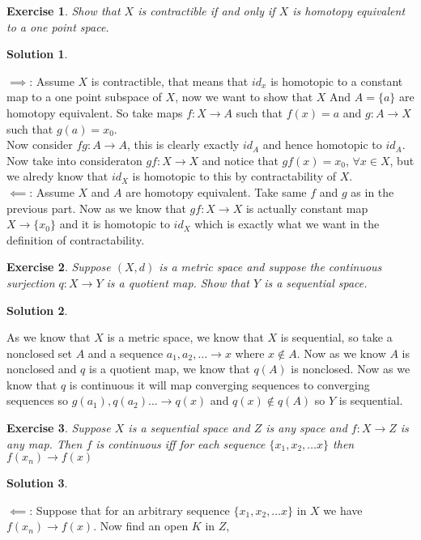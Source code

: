 \documentclass[11pt,a4paper]{article}
\newtheorem{Ex}{Exercise}
\newtheorem{Sol}{Solution}
\newcommand{\ra}{\rightarrow}
\begin{document}
\begin{Ex}
	Show that $X$ is contractible if and only if $X$ is homotopy equivalent to a one point space.
\end{Ex} 

\begin{Sol}\end{Sol}
\noindent $\implies$: Assume $X$ is contractible, that means that $id_x$ is homotopic to a constant map to a one point subspace of $X$, now we want to show that $X$ And $A = \{a\}$ are homotopy equivalent. So take maps $f: X \ra A$ such that $f(x) =a$ and $g: A \ra X$ such that $g(a) = x_0$. \\
Now consider $fg : A \ra A$, this is clearly exactly $id_A$ and hence homotopic to $id_A$. Now take into consideraton $gf: X \ra X$ and notice that $gf(x) = x_0$, $\forall x\in X$, but we alredy know that $id_X$ is homotopic to this by contractability of $X$. \\
\noindent $\impliedby$: Assume $X$ and $A$ are homotopy equivalent. Take same $f$ and $g$ as in the previous part. Now as we know that $gf: X \ra X$ is actually constant map $X \ra \{x_0\}$ and it is homotopic to $id_X$ which is exactly what we want in the definition of contractability.

\begin{Ex}
	Suppose $(X,d)$ is a metric space and suppose the continuous surjection $q: X \ra Y$ is a quotient map. Show that $Y$ is a sequential space.
\end{Ex}

\begin{Sol}\end{Sol}
\noindent As we know that $X$ is a metric space, we know that $X$ is sequential, so take a nonclosed set $A$ and a sequence $a_1,a_2,\dots \ra x$ where $x \not\in A$. Now as we know $A$ is nonclosed and $q$ is a quotient map, we know that $q(A)$ is nonclosed. Now as we know that $q$ is continuous it will map converging sequences to converging sequences so $g(a_1), q(a_2) \dots \ra q(x)$ and $q(x) \not\in q(A)$ so $Y$ is sequential.

\begin{Ex}
	Suppose $X$ is a sequential space and $Z$ is any space and $f: X\ra Z$ is any map. Then $f$ is continuous iff for each sequence $\{x_1,x_2,\dots x\}$ then $f(x_n) \ra f(x)$  
\end{Ex}

\begin{Sol}
\end{Sol}
\noindent $\impliedby$: Suppose that for an arbitrary sequence $\{x_1,x_2,\dots x\}$ in $X$ we have $f(x_n) \ra f(x)$. Now find an open $K$ in $Z$,    
\end{document}
